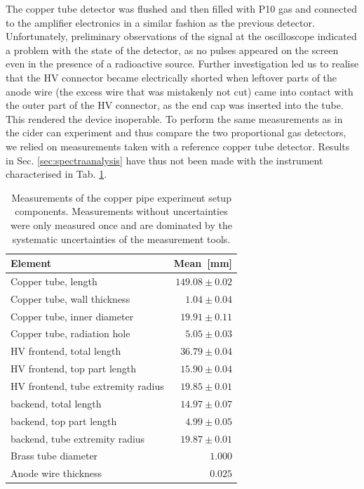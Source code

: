 The copper tube detector was flushed and then filled with P10 gas and connected to the amplifier electronics in a similar fashion as the previous detector. Unfortunately, preliminary observations of the signal at the oscilloscope indicated a problem with the state of the detector, as no pulses appeared on the screen even in the presence of a radioactive source. Further investigation led us to realise that the HV connector became electrically shorted when leftover parts of the anode wire (the excess wire that was mistakenly not cut) came into contact with the outer part of the HV connector, as the end cap was inserted into the tube. This rendered the device inoperable. To perform the same measurements as in the cider can experiment and thus compare the two proportional gas detectors, we relied on measurements taken with a reference copper tube detector.
Results in Sec. \ref{sec:spectraanalysis} have thus not been made with the instrument characterised in Tab. \ref{Tab:coppercan_sizes}.

\begin{table}[htb]
	\begin{tabularx}{\linewidth}{p{4.5cm}r}
		\textbf{Element} & \textbf{Mean}~{[}mm{]}          \\ \hline
		Copper tube, length                & $149.08 \pm 0.02$ \\
		Copper tube, wall thickness        & $1.04 \pm 0.04$   \\
		Copper tube, inner diameter        & $19.91 \pm 0.11$  \\
		Copper tube, radiation hole        & $5.05 \pm 0.03$   \\
		HV frontend, total length          & $36.79 \pm 0.04$  \\
		HV frontend, top part length       & $15.90 \pm 0.04$  \\
		HV frontend, tube extremity radius & $19.85 \pm 0.01$  \\
		backend, total length              & $14.97 \pm 0.07$  \\
		backend, top part length           & $4.99 \pm 0.05$   \\
		backend, tube extremity radius     & $19.87 \pm 0.01$  \\
		Brass tube diameter                & $1.000$           \\
		Anode wire thickness               & $0.025$           \\ \hline
	\end{tabularx}
\caption{Measurements of the copper pipe experiment setup components. Measurements without uncertainties were only measured once and are dominated by the systematic uncertainties of the measurement tools.}%
\label{Tab:coppercan_sizes}
\end{table}

